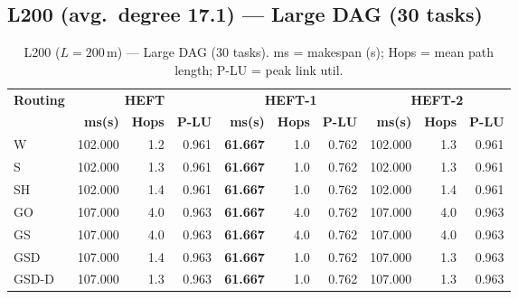 \documentclass[11pt]{article}
\newcommand{\win}[1]{\textcolor{green!50!black}{\textbf{#1}}}
\newcommand{\bad}[1]{\textcolor{red!70!black}{#1}}
\begin{document}
\subsection{L200 (avg.\ degree 17.1) --- Large DAG (30 tasks)}
\begin{table}[H]
\centering\small
\begin{tabular}{l r r r r r r r r r}
\toprule
\textbf{Routing} & \multicolumn{3}{c}{\textbf{HEFT}} & \multicolumn{3}{c}{\textbf{HEFT-1}} & \multicolumn{3}{c}{\textbf{HEFT-2}} \\
\cmidrule(lr){2-4}\cmidrule(lr){5-7}\cmidrule(lr){8-10}
& \textbf{ms(s)} & \textbf{Hops} & \textbf{P-LU} & \textbf{ms(s)} & \textbf{Hops} & \textbf{P-LU} & \textbf{ms(s)} & \textbf{Hops} & \textbf{P-LU} \\
\midrule
  W & 102.000 & 1.2 & 0.961 & \win{61.667} & 1.0 & 0.762 & 102.000 & 1.3 & 0.961 \\
  S & 102.000 & 1.3 & 0.961 & \win{61.667} & 1.0 & 0.762 & 102.000 & 1.3 & 0.961 \\
  SH & 102.000 & 1.4 & 0.961 & \win{61.667} & 1.0 & 0.762 & 102.000 & 1.4 & 0.961 \\
  GO & \bad{107.000} & 4.0 & 0.963 & \win{61.667} & 4.0 & 0.762 & \bad{107.000} & 4.0 & 0.963 \\
  GS & \bad{107.000} & 4.0 & 0.963 & \win{61.667} & 4.0 & 0.762 & \bad{107.000} & 4.0 & 0.963 \\
  GSD & \bad{107.000} & 1.4 & 0.963 & \win{61.667} & 1.0 & 0.762 & \bad{107.000} & 1.3 & 0.963 \\
  GSD-D & \bad{107.000} & 1.3 & 0.963 & \win{61.667} & 1.0 & 0.762 & \bad{107.000} & 1.3 & 0.963 \\
\bottomrule
\end{tabular}
\caption{L200 ($L=200$\,m) --- Large DAG (30 tasks). ms = makespan (s); Hops = mean path length; P-LU = peak link util.}
\end{table}
\end{document}
